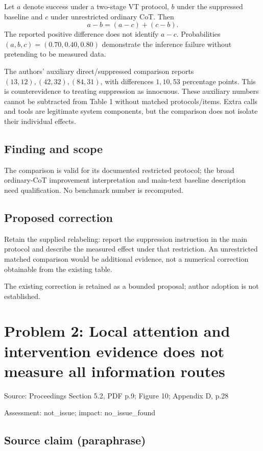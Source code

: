 \documentclass[11pt]{article}
\begin{document}
Let \(a\) denote success under a two-stage VT protocol, \(b\) under the suppressed baseline and \(c\) under unrestricted ordinary CoT. Then \[a-b=(a-c)+(c-b).\] The reported positive difference does not identify \(a-c\). Probabilities \((a,b,c)=(0.70,0.40,0.80)\) demonstrate the inference failure without pretending to be measured data.

The authors’ auxiliary direct/suppressed comparison reports \((13,12),(42,32),(84,31)\), with differences \(1,10,53\) percentage points. This is counterevidence to treating suppression as innocuous. These auxiliary numbers cannot be subtracted from Table 1 without matched protocols/items. Extra calls and tools are legitimate system components, but the comparison does not isolate their individual effects.

\subsection*{Finding and scope}

The comparison is valid for its documented restricted protocol; the broad ordinary-CoT improvement interpretation and main-text baseline description need qualification. No benchmark number is recomputed.

\subsection*{Proposed correction}

Retain the supplied relabeling: report the suppression instruction in the main protocol and describe the measured effect under that restriction. An unrestricted matched comparison would be additional evidence, not a numerical correction obtainable from the existing table.

The existing correction is retained as a bounded proposal; author adoption is not established.

\section*{Problem 2: Local attention and intervention evidence does not measure all information routes}

Source: Proceedings Section 5.2, PDF p.9; Figure 10; Appendix D, p.28

Assessment: not\_issue; impact: no\_issue\_found

\subsection*{Source claim (paraphrase)}
\end{document}

